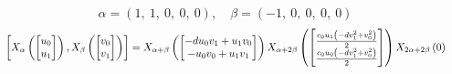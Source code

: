 \documentclass[11pt]{article}
\theoremstyle{definition}
\begin{document}
\[
\alpha = \left( 1, \  1, \  0, \  0, \  0\right), \quad \beta = \left( -1, \  0, \  0, \  0, \  0\right)
\]
\[
\scaletoalign{\textwidth}{\left[ X_{\alpha}\left(\left[\begin{matrix}u_{0}\\u_{1}\end{matrix}\right]\right), X_{\beta}\left(\left[\begin{matrix}v_{0}\\v_{1}\end{matrix}\right]\right) \right] = X_{\alpha + \beta}\left(\left[\begin{matrix}- d u_{0} v_{1} + u_{1} v_{0}\\- u_{0} v_{0} + u_{1} v_{1}\end{matrix}\right]\right) X_{\alpha + 2\beta}\left(\left[\begin{matrix}\frac{c_{0} u_{1} \left(- d v_{1}^{2} + v_{0}^{2}\right)}{2}\\\frac{c_{0} u_{0} \left(- d v_{1}^{2} + v_{0}^{2}\right)}{2}\end{matrix}\right]\right) X_{2\alpha + 2\beta}\left(0\right)}
\]
\end{document}
